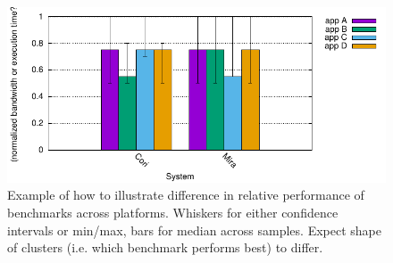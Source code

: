 \documentclass[conference,10pt,compsocconf]{IEEEtran}
\begin{document}
\begin{figure}[t]
\centering
\includegraphics[width=0.8\columnwidth]{figs/example-bar-var.pdf}
\caption{Example of how to illustrate difference in relative performance of
benchmarks across platforms.  Whiskers for either confidence intervals or
min/max, bars for median across samples.  Expect shape of clusters (i.e.
which benchmark performs best) to differ.}
\label{fig:example-bar-var}
\vspace{-.1in}
\end{figure}
\end{document}
